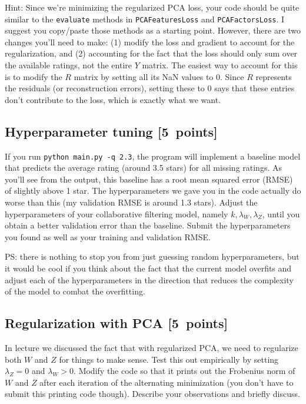 \documentclass{article}
\newcommand{\blu}[1]{{\textcolor{blu}{#1}}}
\let\ask\blu
\newcommand\pts[1]{\textcolor{pointscolour}{[#1~points]}}
\begin{document}
Hint: Since we're minimizing the regularized PCA loss, your code should be quite similar to the \texttt{evaluate} methods in \texttt{PCAFeaturesLoss} and \texttt{PCAFactorsLoss}. I suggest you copy/paste those methods as a starting point. However, there are two changes you'll need to make: (1) modify the loss and gradient to account for the regularization, and (2) accounting for the fact that the loss should only sum over the available ratings, not the entire $Y$ matrix. The easiest way to account for this is to modify the $R$ matrix by setting all its NaN values to 0. Since $R$ represents the residuals (or reconstruction errors), setting these to 0 says that these entries don't contribute to the loss, which is exactly what we want.



\subsection{Hyperparameter tuning \pts{5}}
If you run \texttt{python main.py -q 2.3}, the program will implement a baseline model that predicts the average rating (around 3.5 stars) for all missing ratings.
As you'll see from the output, this baseline has a root mean squared error (RMSE) of slightly above 1 star. The hyperparameters we gave you in the code actually do worse than this (my validation RMSE is around 1.3 stars). \ask{Adjust the hyperparameters of your collaborative filtering model, namely $k,\lambda_W,\lambda_Z$, until you obtain a better validation error than the baseline. Submit the hyperparameters you found as well as your training and validation RMSE.}

PS: there is nothing to stop you from just guessing random hyperparameters, but it would be cool if you think about the fact that the current model overfits and adjust each of the hyperparameters in the direction that reduces the complexity of the model to combat the overfitting.


\subsection{Regularization with PCA \pts{5}}

In lecture we discussed the fact that with regularized PCA, we need to regularize both $W$ and $Z$ for things to make sense. Test this out empirically by setting $\lambda_Z=0$ and $\lambda_W>0$. Modify the code so that it prints out the Frobenius norm of $W$ and $Z$ after each iteration of the alternating minimization (you don't have to submit this printing code though). \ask{Describe your observations and briefly discuss.}
\end{document}
